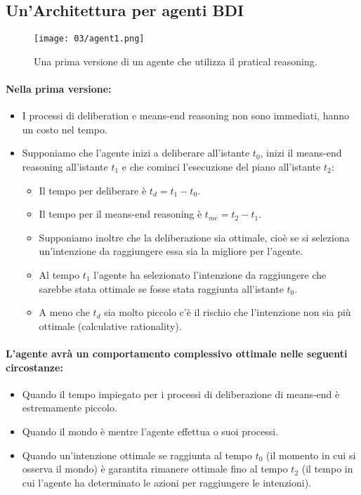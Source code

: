 \subsection{Un'Architettura per agenti BDI}

\begin{figure}[!h]
    \centering
    \texttt{[image: 03/agent1.png]}
    \caption{Una prima versione di un agente che utilizza il pratical reasoning.}
\end{figure}

\paragraph{Nella prima versione:}

\begin{itemize}
  \item I processi di deliberation e means-end reasoning non sono immediati, hanno un costo nel tempo.
  \item Supponiamo che l'agente inizi a deliberare all'istante $t_0$, inizi il means-end reasoning all'istante $t_1$ e che cominci l'esecuzione del piano all'istante $t_2$: 
    \begin{itemize}
      \item Il tempo per deliberare è $t_d= t_1 - t_0$. 
    \item Il tempo per il means-end reasoning è $t_{me} = t_2 - t_1$. 
    \item Supponiamo inoltre che la deliberazione sia ottimale, cioè se si seleziona un'intenzione da raggiungere essa sia la migliore per l'agente. 
    \item Al tempo $t_1$ l'agente ha selezionato l'intenzione da raggiungere che sarebbe stata ottimale se fosse stata raggiunta all'istante $t_0$.
      \item A meno che $t_d$ sia molto piccolo c'è il rischio che l'intenzione non sia più ottimale (calculative rationality). 
    \end{itemize}
\end{itemize}

\paragraph{L'agente avrà un comportamento complessivo ottimale nelle seguenti circostanze:}

\begin{itemize}
  \item Quando il tempo impiegato per i processi di deliberazione di means-end è estremamente piccolo. 
  \item Quando il mondo è  mentre l'agente effettua o suoi processi. 
  \item Quando un'intenzione ottimale se raggiunta al tempo $t_0$ (il momento in cui si osserva il mondo) è garantita rimanere ottimale fino al tempo $t_2$ (il tempo in cui l'agente ha determinato le azioni per raggiungere le intenzioni).
\end{itemize}

